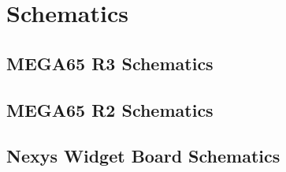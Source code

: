 \chapter{Schematics}
\section{MEGA65 R3 Schematics}

\section{MEGA65 R2 Schematics}

\section{Nexys Widget Board Schematics}
\label{sec:nexyswidgetschematics}


